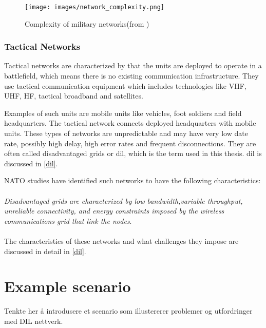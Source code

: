 \documentclass[USenglish]{ifimaster}
\begin{document}
\begin{figure}[h]
\texttt{[image: images/network\_complexity.png]}
\caption{Complexity of military networks(from \cite{pervasive-web})}
\label{figure:military-networks}
\end{figure}


\subsubsection{Tactical Networks}
Tactical networks are characterized by that the units are deployed to operate in
a battlefield, which means there is no existing communication infrastructure.
They use tactical communication equipment which includes technologies like VHF,
UHF, HF, tactical broadband and satellites\cite{ist-090}.

Examples of such units are mobile units like vehicles, foot soldiers and field
headquarters. The tactical network connects deployed headquarters with mobile
units. These types of networks are unpredictable and may have very low date
rate, possibly high delay, high error rates and frequent disconnections. They
are often called disadvantaged grids or \gls{dil}, which is the term used in
this thesis. \gls{dil} is discussed in \cref{dil}.

NATO studies\cite{nato-disadvantaged-grids} have identified such networks to
have the following characteristics:
\\\\
\textit{
Disadvantaged grids are characterized by low bandwidth,variable throughput,
unreliable connectivity, and energy constraints imposed by the wireless
communications grid that link the nodes}.
\paragraph{}
The characteristics of these networks and what challenges they impose are
discussed in detail in \cref{dil}.

\section{Example scenario}

Tenkte her å introdusere et scenario som illustererer problemer og utfordringer
med DIL nettverk.
\end{document}
